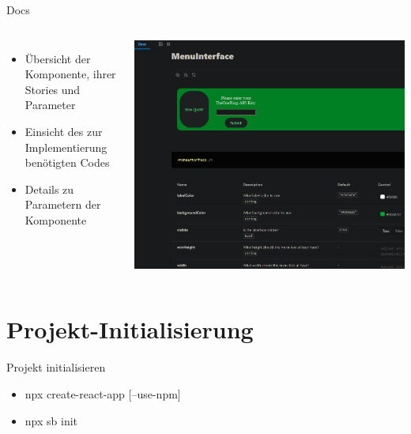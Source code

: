 \documentclass{beamer}
\begin{document}
\begin{frame}{Docs}
	\begin{columns}
		\begin{itemize}
			\item Übersicht der Komponente, ihrer Stories und Parameter
			\item Einsicht des zur Implementierung benötigten Codes
			\item Details zu Parametern der Komponente
		\end{itemize}
		
		\includegraphics[width=\linewidth]{Images/web-ui/docs.png}
	\end{columns}
\end{frame}

\section{Projekt-Initialisierung} %

\begin{frame}{Projekt initialisieren}
	\begin{itemize}
		\item npx create-react-app [--use-npm]
		\item npx sb init
	\end{itemize}
\end{frame}
\end{document}
